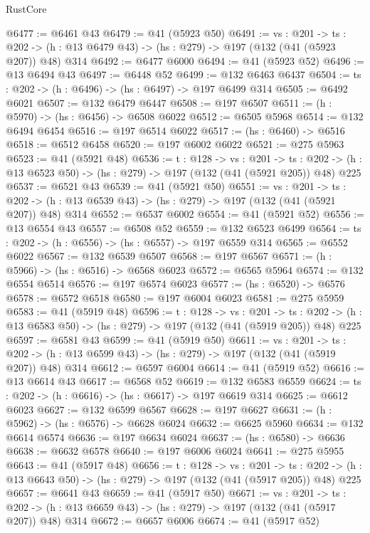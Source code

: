 \begin{lexlean}{RustCore}
\begin{coremodule}
@6477 := @6461 @43
@6479 := @41 (@5923 @50)
@6491 := {vs : @201} ->
  {ts : @202} -> (h : @13 @6479 @43) -> (hs : @279) -> @197 (@132 (@41 (@5923 @207)) @48) @314
@6492 := @6477 @6000
@6494 := @41 (@5923 @52)
@6496 := @13 @6494 @43
@6497 := @6448 @52
@6499 := @132 @6463 @6437
@6504 := {ts : @202} -> (h : @6496) -> (hs : @6497) -> @197 @6499 @314
@6505 := @6492 @6021
@6507 := @132 @6479 @6447
@6508 := @197 @6507
@6511 := (h : @5970) -> (hs : @6456) -> @6508 @6022
@6512 := @6505 @5968
@6514 := @132 @6494 @6454
@6516 := @197 @6514 @6022
@6517 := (hs : @6460) -> @6516
@6518 := @6512 @6458
@6520 := @197 @6002 @6022
@6521 := @275 @5963
@6523 := @41 (@5921 @48)
@6536 := {t : @128} ->
  {vs : @201} ->
  {ts : @202} -> (h : @13 @6523 @50) -> (hs : @279) -> @197 (@132 (@41 (@5921 @205)) @48) @225
@6537 := @6521 @43
@6539 := @41 (@5921 @50)
@6551 := {vs : @201} ->
  {ts : @202} -> (h : @13 @6539 @43) -> (hs : @279) -> @197 (@132 (@41 (@5921 @207)) @48) @314
@6552 := @6537 @6002
@6554 := @41 (@5921 @52)
@6556 := @13 @6554 @43
@6557 := @6508 @52
@6559 := @132 @6523 @6499
@6564 := {ts : @202} -> (h : @6556) -> (hs : @6557) -> @197 @6559 @314
@6565 := @6552 @6022
@6567 := @132 @6539 @6507
@6568 := @197 @6567
@6571 := (h : @5966) -> (hs : @6516) -> @6568 @6023
@6572 := @6565 @5964
@6574 := @132 @6554 @6514
@6576 := @197 @6574 @6023
@6577 := (hs : @6520) -> @6576
@6578 := @6572 @6518
@6580 := @197 @6004 @6023
@6581 := @275 @5959
@6583 := @41 (@5919 @48)
@6596 := {t : @128} ->
  {vs : @201} ->
  {ts : @202} -> (h : @13 @6583 @50) -> (hs : @279) -> @197 (@132 (@41 (@5919 @205)) @48) @225
@6597 := @6581 @43
@6599 := @41 (@5919 @50)
@6611 := {vs : @201} ->
  {ts : @202} -> (h : @13 @6599 @43) -> (hs : @279) -> @197 (@132 (@41 (@5919 @207)) @48) @314
@6612 := @6597 @6004
@6614 := @41 (@5919 @52)
@6616 := @13 @6614 @43
@6617 := @6568 @52
@6619 := @132 @6583 @6559
@6624 := {ts : @202} -> (h : @6616) -> (hs : @6617) -> @197 @6619 @314
@6625 := @6612 @6023
@6627 := @132 @6599 @6567
@6628 := @197 @6627
@6631 := (h : @5962) -> (hs : @6576) -> @6628 @6024
@6632 := @6625 @5960
@6634 := @132 @6614 @6574
@6636 := @197 @6634 @6024
@6637 := (hs : @6580) -> @6636
@6638 := @6632 @6578
@6640 := @197 @6006 @6024
@6641 := @275 @5955
@6643 := @41 (@5917 @48)
@6656 := {t : @128} ->
  {vs : @201} ->
  {ts : @202} -> (h : @13 @6643 @50) -> (hs : @279) -> @197 (@132 (@41 (@5917 @205)) @48) @225
@6657 := @6641 @43
@6659 := @41 (@5917 @50)
@6671 := {vs : @201} ->
  {ts : @202} -> (h : @13 @6659 @43) -> (hs : @279) -> @197 (@132 (@41 (@5917 @207)) @48) @314
@6672 := @6657 @6006
@6674 := @41 (@5917 @52)

\end{coremodule}
\end{lexlean}
